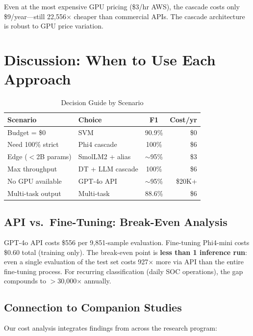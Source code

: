 \documentclass[review,3p]{elsarticle}
\begin{document}
Even at the most expensive GPU pricing (\$3/hr AWS), the cascade costs only \$9/year---still 22,556$\times$ cheaper than commercial APIs. The cascade architecture is robust to GPU price variation.

\section{Discussion: When to Use Each Approach}

\begin{table}[!ht]
\centering
\caption{Decision Guide by Scenario}
\label{tab:decision}
\begin{tabular}{p{2.8cm}lcr}
\toprule
\textbf{Scenario} & \textbf{Choice} & \textbf{F1} & \textbf{Cost/yr} \\
\midrule
Budget = \$0 & SVM & 90.9\% & \$0 \\
Need 100\% strict & Phi4 cascade & 100\% & \$6 \\
Edge ($<$2B params) & SmolLM2 + alias & $\sim$95\% & \$3 \\
Max throughput & DT + LLM cascade & 100\% & \$6 \\
No GPU available & GPT-4o API & $\sim$95\% & \$20K+ \\
Multi-task output & Multi-task~\cite{p15} & 88.6\% & \$6 \\
\bottomrule
\end{tabular}
\end{table}

\subsection{API vs.\ Fine-Tuning: Break-Even Analysis}
GPT-4o API costs \$556 per 9,851-sample evaluation. Fine-tuning Phi4-mini costs \$0.60 total (training only). The break-even point is \textbf{less than 1 inference run}: even a single evaluation of the test set costs 927$\times$ more via API than the entire fine-tuning process. For recurring classification (daily SOC operations), the gap compounds to $>$30,000$\times$ annually.

\subsection{Connection to Companion Studies}
Our cost analysis integrates findings from across the research program:
\end{document}
